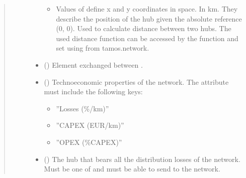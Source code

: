 \documentclass[letterpaper,10pt,english]{sphinxmanual}
\begin{document}
\begin{fulllineitems}
\begin{fulllineitems}
\begin{quote}
\begin{description}
\begin{itemize}
\begin{itemize}
\item {} 
\sphinxAtStartPar
Values of  define x and y coordinates in space.
In km.
They describe the position of the hub given the absolute reference (0, 0).
Used to calculate distance between two hubs. The used distance function can be accessed by the
 function and set using  from tamos.network.

\end{itemize}


\item {} 
\sphinxAtStartPar
{} ({\hyperref[\detokenize{generated/tamos.element.ElectricityVector:tamos.element.ElectricityVector}]{}}) \textendash{} Element exchanged between .

\item {} 
\sphinxAtStartPar
{} (\sphinxstyleliteralemphasis{\sphinxupquote{ | }}) \textendash{} 
\sphinxAtStartPar
Techno\sphinxhyphen{}economic properties of the network.
The  attribute must include the following keys:
\begin{itemize}
\item {} 
\sphinxAtStartPar
”Losses (\%/km)”

\item {} 
\sphinxAtStartPar
”CAPEX (EUR/km)”

\item {} 
\sphinxAtStartPar
”OPEX (\%CAPEX)”

\end{itemize}


\item {} 
\sphinxAtStartPar
{} ({\hyperref[\detokenize{generated/tamos.Hub:tamos.Hub}]{}}) \textendash{} The hub that bears all the distribution losses of the network.
Must be one of  and must be able to send  to the network.


\end{itemize}
\end{description}
\end{quote}
\end{fulllineitems}
\end{fulllineitems}
\end{document}
